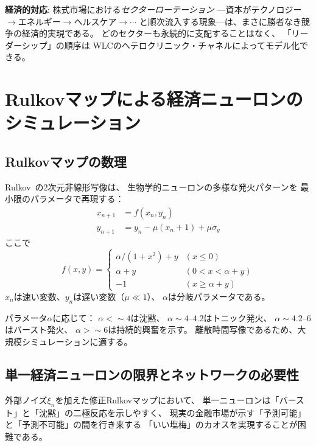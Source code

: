 \documentclass[12pt,twocolumn]{ltjsarticle}
\begin{document}
\textbf{経済的対応}:
株式市場における\emph{セクターローテーション}
---資本がテクノロジー$\to$エネルギー$\to$ヘルスケア$\to \cdots$
と順次流入する現象---は、まさに勝者なき競争の経済的実現である。
どのセクターも永続的に支配することはなく、
「リーダーシップ」の順序は
WLCのヘテロクリニック・チャネルによってモデル化できる。


\section{Rulkovマップによる経済ニューロンのシミュレーション}
\label{sec:simulation}

\subsection{Rulkovマップの数理}

Rulkov~\cite{Rulkov2002}の2次元非線形写像は、
生物学的ニューロンの多様な発火パターンを
最小限のパラメータで再現する：
\begin{align}
x_{n+1} &= f(x_n, y_n) \\
y_{n+1} &= y_n - \mu(x_n + 1) + \mu\sigma_y
\end{align}
ここで
\begin{equation}
f(x,y) = \begin{cases}
\alpha/(1+x^2) + y & (x \leq 0) \\
\alpha + y & (0 < x < \alpha + y) \\
-1 & (x \geq \alpha + y)
\end{cases}
\end{equation}
$x_n$は速い変数、$y_n$は遅い変数（$\mu \ll 1$）、
$\alpha$は分岐パラメータである。

パラメータ$\alpha$に応じて：
$\alpha < \sim 4$は沈黙、
$\alpha \sim 4$--$4.2$はトニック発火、
$\alpha \sim 4.2$--$6$はバースト発火、
$\alpha > \sim 6$は持続的興奮を示す。
離散時間写像であるため、大規模シミュレーションに適する。

\subsection{単一経済ニューロンの限界とネットワークの必要性}

外部ノイズ$\xi_n$を加えた修正Rulkovマップにおいて、
単一ニューロンは「バースト」と「沈黙」の二極反応を示しやすく、
現実の金融市場が示す「予測可能」と「予測不可能」の間を行き来する
「いい塩梅」のカオスを実現することが困難である。
\end{document}
